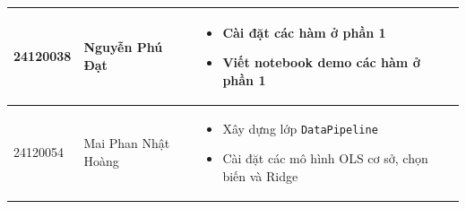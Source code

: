 \begin{table}[H]
\begin{tabularx}{\textwidth}{|p{2cm}|p{4cm}|X|}
        24120038 & Nguyễn Phú Đạt &
        \vspace{-0.5\baselineskip}
        \begin{itemize}[itemsep=0pt, topsep=0pt, partopsep=0pt, parsep=0pt]
            \item Cài đặt các hàm ở phần 1
            \item Viết notebook demo các hàm ở phần 1
        \end{itemize} \\ \hline

        24120054 & Mai Phan Nhật Hoàng &
        \vspace{-0.5\baselineskip}
        \begin{itemize}[itemsep=0pt, topsep=0pt, partopsep=0pt, parsep=0pt]
            \item Xây dựng lớp \texttt{DataPipeline}
            \item Cài đặt các mô hình OLS cơ sở, chọn biến và Ridge
        \end{itemize} \\ \hline
    \end{tabularx}
\end{table}
